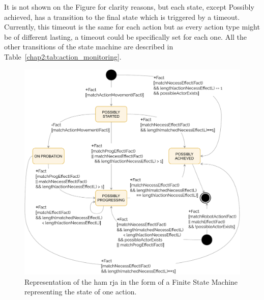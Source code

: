 \documentclass[a4paper,11pt,twoside]{StyleThese}
\begin{document}
It is not shown on the Figure for clarity reasons, but each state, except Possibly achieved, has a transition to the final state which is triggered by a timeout. Currently, this timeout is the same for each action but as every action type might be of different lasting, a timeout could be specifically set for each one. All the other transitions of the state machine are described in Table~\ref{chap2:tab:action_monitoring}. 
 
\begin{figure}[!ht]
	\includegraphics[width=\linewidth]{figures/chapter2/action_sm.pdf}
	\caption{Representation of the \acrfull{ham} \acrshort{rja} in the form of a Finite State Machine representing the state of one action.}
	\label{chap2:fig:action_monitoring}
\end{figure}
\end{document}
